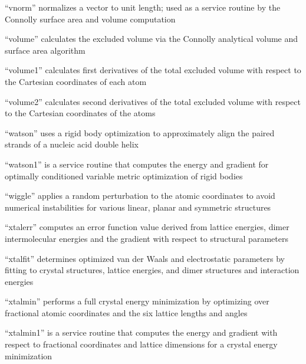 \documentclass[letterpaper,11pt,english]{sphinxmanual}
\begin{document}
“vnorm” normalizes a vector to unit length; used as a
service routine by the Connolly surface area and volume
computation


“volume” calculates the excluded volume via the Connolly
analytical volume and surface area algorithm


“volume1” calculates first derivatives of the total excluded
volume with respect to the Cartesian coordinates of each atom


“volume2” calculates second derivatives of the total excluded
volume with respect to the Cartesian coordinates of the atoms


“watson” uses a rigid body optimization to approximately
align the paired strands of a nucleic acid double helix


“watson1” is a service routine that computes the energy
and gradient for optimally conditioned variable metric
optimization of rigid bodies


“wiggle” applies a random perturbation to the atomic coordinates
to avoid numerical instabilities for various linear, planar and
symmetric structures


“xtalerr” computes an error function value derived from
lattice energies, dimer intermolecular energies and the
gradient with respect to structural parameters


“xtalfit” determines optimized van der Waals and electrostatic
parameters by fitting to crystal structures, lattice energies,
and dimer structures and interaction energies


“xtalmin” performs a full crystal energy minimization by
optimizing over fractional atomic coordinates and the six
lattice lengths and angles


“xtalmin1” is a service routine that computes the energy and
gradient with respect to fractional coordinates and lattice
dimensions for a crystal energy minimization
\end{document}
